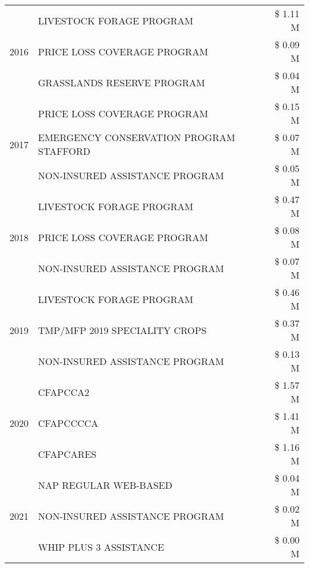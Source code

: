 \begin{tabular}{llr}
\cline{1-3}
\multirow[t]{3}{*}{2016} & LIVESTOCK FORAGE PROGRAM & \$ 1.11 M \\
 & PRICE LOSS COVERAGE PROGRAM & \$ 0.09 M \\
 & GRASSLANDS RESERVE PROGRAM & \$ 0.04 M \\
\cline{1-3}
\multirow[t]{3}{*}{2017} & PRICE LOSS COVERAGE PROGRAM & \$ 0.15 M \\
 & EMERGENCY CONSERVATION PROGRAM STAFFORD & \$ 0.07 M \\
 & NON-INSURED ASSISTANCE PROGRAM & \$ 0.05 M \\
\cline{1-3}
\multirow[t]{3}{*}{2018} & LIVESTOCK FORAGE PROGRAM & \$ 0.47 M \\
 & PRICE LOSS COVERAGE PROGRAM & \$ 0.08 M \\
 & NON-INSURED ASSISTANCE PROGRAM & \$ 0.07 M \\
\cline{1-3}
\multirow[t]{3}{*}{2019} & LIVESTOCK FORAGE PROGRAM & \$ 0.46 M \\
 & TMP/MFP 2019 SPECIALITY CROPS & \$ 0.37 M \\
 & NON-INSURED ASSISTANCE PROGRAM & \$ 0.13 M \\
\cline{1-3}
\multirow[t]{3}{*}{2020} & CFAPCCA2 & \$ 1.57 M \\
 & CFAPCCCCA & \$ 1.41 M \\
 & CFAPCARES & \$ 1.16 M \\
\cline{1-3}
\multirow[t]{3}{*}{2021} & NAP REGULAR WEB-BASED & \$ 0.04 M \\
 & NON-INSURED ASSISTANCE PROGRAM & \$ 0.02 M \\
 & WHIP PLUS 3 ASSISTANCE & \$ 0.00 M \\
\cline{1-3}
\bottomrule
\end{tabular}
